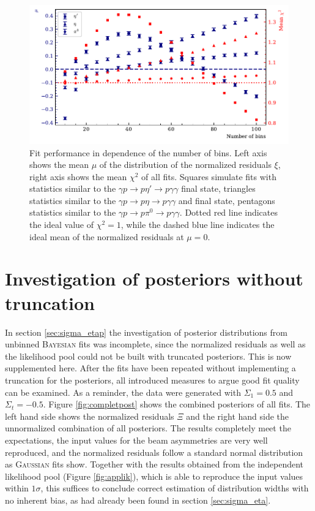 \begin{figure}[htbp]
	\centering
	\includegraphics[width=\linewidth]{../bayes/toyMC/plots/binnedfits.pdf}
	\caption{Fit performance in dependence of the number of bins. Left axis shows the mean $\mu$ of the distribution of the normalized residuals $\xi$, right axis shows the mean $\chi^2$ of all fits. Squares simulate fits with statistics similar to the $\gamma p \to p\eta'\to p\gamma\gamma$ final state, triangles statistics similar to the $\gamma p\to p\eta\to p\gamma\gamma$ and final state, pentagons statistics similar to the $\gamma p \to p \pi^0\to p\gamma\gamma$. Dotted red line indicates the ideal value of $\chi^2=1$, while the dashed blue line indicates the ideal mean of the normalized residuals at $\mu=0$.}
	\label{fig:appbin}
\end{figure}
\chapter{Investigation of posteriors without truncation}
\label{app:trunc}
In section \ref{sec:sigma_etap} the investigation of posterior distributions from unbinned \textsc{Bayesian} fits was incomplete, since the normalized residuals as well as the likelihood pool could not be built with truncated posteriors. This is now supplemented here. After the fits have been repeated without implementing a truncation for the posteriors, all introduced measures to argue good fit quality can be examined. As a reminder, the data were generated with $\Sigma_1=0.5$ and $\Sigma_t=-0.5$. Figure \ref{fig:completpost} shows the combined posteriors of all fits. The left hand side shows the normalized residuals $\Xi$ and the right hand side the unnormalized combination of all posteriors. The results completely meet the expectations, the input values for the beam asymmetries are very well reproduced, and the normalized residuals follow a standard normal distribution as \textsc{Gaussian} fits show. Together with the results obtained from the independent likelihood pool (Figure \ref{fig:applik}), which is able to reproduce the input values within $1\sigma$, this suffices to conclude correct estimation of distribution widths with no inherent bias, as had already been found in section \ref{sec:sigma_eta}.

